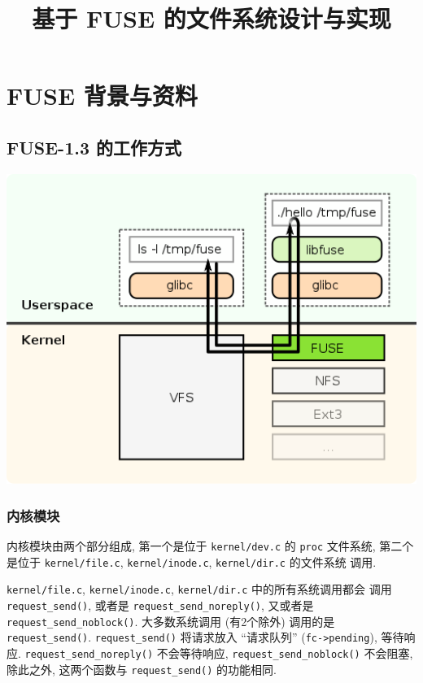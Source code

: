 \documentclass[nofonts, titlepage]{ctexart}
\title{基于 FUSE 的文件系统设计与实现}
\begin{document}
\maketitle
\tableofcontents

\section{FUSE 背景与资料}\label{fuse-ux80ccux666fux4e0eux8d44ux6599}

\subsection{FUSE-1.3 的工作方式}

\begin{center}
\includegraphics[width=14cm]{./images/./FUSE_structure.svg.png}
\label{fig:fuse_structure}
\end{center}

\subsubsection{内核模块}\label{ux5185ux6838ux6a21ux5757}

内核模块由两个部分组成, 第一个是位于 \texttt{kernel/dev.c} 的
\texttt{proc} 文件系统, 第二个是位于 \texttt{kernel/file.c},
\texttt{kernel/inode.c}, \texttt{kernel/dir.c} 的文件系统 调用.

\texttt{kernel/file.c}, \texttt{kernel/inode.c}, \texttt{kernel/dir.c}
中的所有系统调用都会 调用 \texttt{request\_send()}, 或者是
\texttt{request\_send\_noreply()}, 又或者是
\texttt{request\_send\_noblock()}. 大多数系统调用 (有2个除外) 调用的是
\texttt{request\_send()}. \texttt{request\_send()} 将请求放入
``请求队列'' (\texttt{fc-\textgreater{}pending}), 等待响应.
\texttt{request\_send\_noreply()} 不会等待响应,
\texttt{request\_send\_noblock()} 不会阻塞, 除此之外, 这两个函数与
\texttt{request\_send()} 的功能相同.
\end{document}
